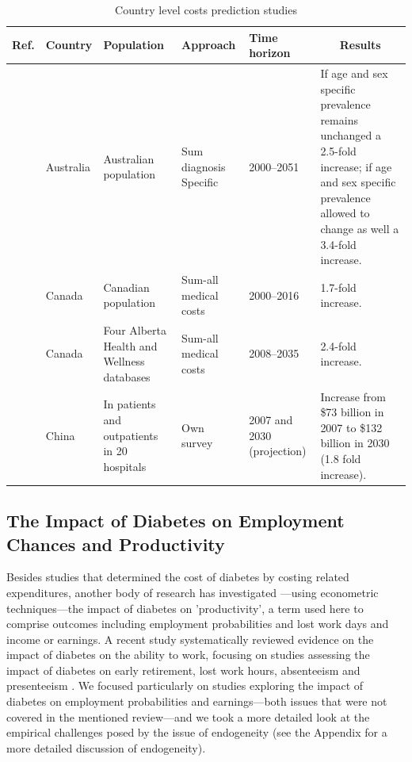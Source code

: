 \documentclass[12pt,english]{article}
\begin{document}
\begin{table}[hp]
\begin{tabularx}{\linewidth}{m m m m m b}
\caption{Country level costs prediction studies}\label{tab:review_prediction}\\
\toprule
Ref. & Country & Population   & Approach & Time  horizon & \multicolumn{1}{c}{Results}                                                                                                                                            \\ \midrule
\textcite{Davis2006b}  & Australia & Australian   population                       & Sum diagnosis  Specific & 2000--2051                                                              & If age and sex specific prevalence remains unchanged a 2.5-fold increase; if age and sex specific prevalence allowed to change as well a 3.4-fold increase. \\
\textcite{Ohinmaa2004}  & Canada    & Canadian   population                         & Sum-all   medical costs  & 2000--2016                                                              & 1.7-fold increase.                                                                                                                                          \\
\textcite{Lau2011a}  & Canada    & Four   Alberta Health and Wellness databases  & Sum-all  medical costs  & 2008--2035                                                              & 2.4-fold increase.                                                                                                                                          \\
\textcite{Wang2009f}  & China     & In   patients and outpatients in 20 hospitals & Own   survey             & 2007 and  2030 (projection) & Increase from \$73 billion in 2007 to \$132 billion in 2030 (1.8 fold increase).                                       \\ \bottomrule
\end{tabularx}
\end{table}

\subsection{The Impact of Diabetes on Employment Chances and Productivity}
Besides studies that determined the cost of diabetes by costing related expenditures, another body of research has investigated ---using econometric techniques---the impact of diabetes on 'productivity', a term used here to comprise outcomes including employment probabilities and lost work days and income or earnings. A recent study systematically reviewed evidence on the impact of diabetes on the ability to work, focusing on studies assessing the impact of diabetes on early retirement, lost work hours, absenteeism and presenteeism \parencite{Breton2013}. We focused particularly on studies exploring the impact of diabetes on employment probabilities and earnings---both issues that were not covered in the mentioned review---and we took a more detailed look at the empirical challenges posed by the issue of endogeneity (see the Appendix for a more detailed discussion of endogeneity).
\end{document}
